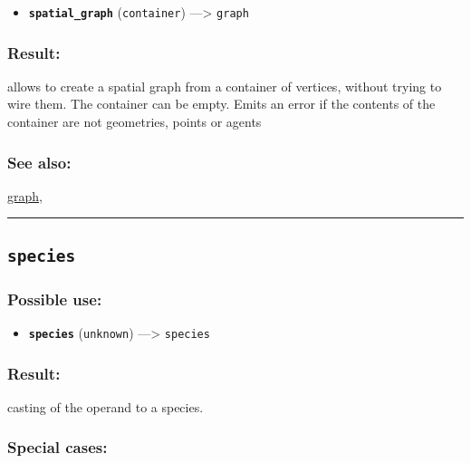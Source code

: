 \documentclass[]{book}
\providecommand{\tightlist}{%
  \setlength{\itemsep}{0pt}\setlength{\parskip}{0pt}}
\theoremstyle{definition}
\theoremstyle{definition}
\theoremstyle{definition}
\theoremstyle{remark}
\begin{document}
\begin{itemize}
\tightlist
\item
  \textbf{\texttt{spatial\_graph}} (\texttt{container})
  ---\textgreater{} \texttt{graph}
\end{itemize}

\subsubsection{Result:}\label{result-472}

allows to create a spatial graph from a container of vertices, without
trying to wire them. The container can be empty. Emits an error if the
contents of the container are not geometries, points or agents

\subsubsection{See also:}\label{see-also-190}

\href{operators-d-to-h.html\#graph}{graph},

\begin{center}\rule{0.5\linewidth}{\linethickness}\end{center}

\subsection{\texorpdfstring{\texttt{species}}{species}}\label{species}

\subsubsection{Possible use:}\label{possible-use-489}

\begin{itemize}
\tightlist
\item
  \textbf{\texttt{species}} (\texttt{unknown}) ---\textgreater{}
  \texttt{species}
\end{itemize}

\subsubsection{Result:}\label{result-473}

casting of the operand to a species.

\subsubsection{Special cases:}\label{special-cases-126}
\end{document}

